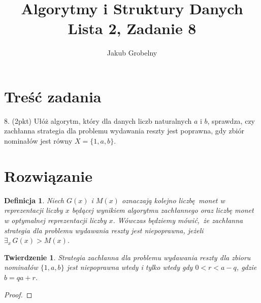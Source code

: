 \documentclass[12pt]{article}
\title{\bfseries Algorytmy i Struktury Danych\\\Large Lista 2, Zadanie 8}
\date{}
\author{\large Jakub Grobelny}
\newtheorem*{theorem*}{Twierdzenie}
\newtheorem*{definition*}{Definicja}
\begin{document}
\begin{titlepage}
\maketitle
\thispagestyle{empty}

\section{Treść zadania}

8. (2pkt) Ułóż algorytm, który dla danych liczb naturalnych $a$ i $b$, sprawdza,
czy zachłanna strategia dla problemu wydawania reszty jest poprawna, gdy zbiór
nominałów jest równy $X = \{1, a, b\}$.

\section{Rozwiązanie}

\begin{definition*}
\theoremstyle{remark}\normalfont
Niech $G(x)$ i $M(x)$ oznaczają kolejno liczbę monet w reprezentacji liczby $x$
będącej wynikiem algorytmu zachłannego oraz liczbę monet w optymalnej
reprezentacji liczby $x$. Wówczas będziemy mówić, że zachłanna strategia
dla problemu wydawania reszty jest niepoprawna, jeżeli $\exists_x\,G(x) > M(x)$.
\end{definition*}

\begin{theorem*}\normalfont
Strategia zachłanna dla problemu wydawania reszty dla zbioru nominałów 
$\{1, a, b\}$ jest niepoprawna wtedy i tylko wtedy gdy $0 < r < a - q$,
gdzie $b = qa + r$.
\end{theorem*}

\begin{proof}
\end{proof}

\end{titlepage}
\end{document}
